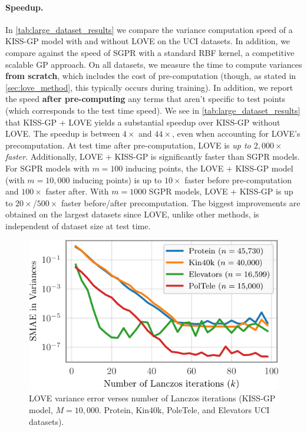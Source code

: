 \paragraph{Speedup.}
In \cref{tab:large_dataset_results} we compare the variance computation speed of a KISS-GP model with and without LOVE{} on the UCI datasets.
In addition, we compare against the speed of SGPR with a standard RBF kernel, a competitive scalable GP approach.
On all datasets, we measure the time to compute variances {\bf from scratch}, which includes the cost of pre-computation (though, as stated in \cref{sec:love_method}, this typically occurs during training).
In addition, we report the speed {\bf after pre-computing} any terms that aren't specific to test points (which corresponds to the test time speed).
We see in \cref{tab:large_dataset_results} that KISS-GP + LOVE{} yields a substantial speedup over KISS-GP without LOVE{}.
The speedup is between $4\times$ and $44\times$, even when accounting for LOVE{}'s precomputation.
At test time after pre-computation, LOVE{} is \emph{up to $2,\!000\times$ faster}.
Additionally, LOVE + KISS-GP{} is significantly faster than SGPR models.
For SGPR models with $m=100$ inducing points, the LOVE + KISS-GP{} model (with $m=10,\!000$ inducing points) is up to $10\times$ faster before pre-computation and $100\times$ faster after.
With $m=1000$ SGPR models, LOVE + KISS-GP{} is up to $20\times$/$500\times$ faster before/after precomputation.
The biggest improvements are obtained on the largest datasets since LOVE{}, unlike other methods, is independent of dataset size at test time.

\begin{figure}[t!]
  \centering
  \includegraphics[width=0.70\columnwidth]{figures/lanczos_accuracy.pdf}
  \vspace{-2ex}
  \caption[LOVE variance error verses number of Lanczos iterations.]{
    LOVE variance error verses number of Lanczos iterations
    (KISS-GP model, $M=10,\!000$. Protein, Kin40k, PoleTele, and Elevators UCI datasets).
    \label{fig:lanczos_accuracy}
  }
  \vspace{-1ex}
\end{figure}

